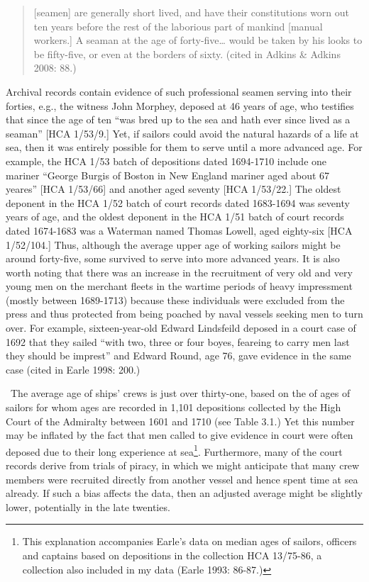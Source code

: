 \begin{quotation}
[seamen] are generally short lived, and have their constitutions worn out ten years before the rest of the laborious part of mankind [manual workers.] A seaman at the age of forty-five… would be taken by his looks to be fifty-five, or even at the borders of sixty. (cited in Adkins \& Adkins 2008: 88.) 

\end{quotation}
\begin{styleStandard}
Archival records contain evidence of such professional seamen serving into their forties, e.g., the witness John Morphey, deposed at 46 years of age, who testifies that since the age of ten “was bred up to the sea and hath ever since lived as a seaman” [HCA 1/53/9.] Yet, if sailors could avoid the natural hazards of a life at sea, then it was entirely possible for them to serve until a more advanced age. For example, the HCA 1/53 batch of depositions dated 1694-1710 include one mariner “George Burgis of Boston in New England mariner aged about 67 yeares” [HCA 1/53/66] and another aged seventy [HCA 1/53/22.] The oldest deponent in the HCA 1/52 batch of court records dated 1683-1694 was seventy years of age, and the oldest deponent in the HCA 1/51 batch of court records dated 1674-1683 was a Waterman named Thomas Lowell, aged eighty-six [HCA 1/52/104.] Thus, although the average upper age of working sailors might be around forty-five, some survived to serve into more advanced years. It is also worth noting that there was an increase in the recruitment of very old and very young men on the merchant fleets in the wartime periods of heavy impressment (mostly between 1689-1713) because these individuals were excluded from the press and thus protected from being poached by naval vessels seeking men to turn over. For example, sixteen-year-old Edward Lindsfeild deposed in a court case of 1692 that they sailed “with two, three or four boyes, feareing to carry men last they should be imprest” and Edward Round, age 76, gave evidence in the same case (cited in Earle 1998: 200.) 
\end{styleStandard}


\begin{styleStandard}
\ The average age of ships’ crews is just over thirty-one, based on the of ages of sailors for whom ages are recorded in 1,101 depositions collected by the High Court of the Admiralty between 1601 and 1710 (see Table 3.1.) Yet this number may be inflated by the fact that men called to give evidence in court were often deposed due to their long experience at sea\footnote{ This explanation accompanies Earle’s data on median ages of sailors, officers and captains based on depositions in the collection HCA 13/75-86, a collection also included in my data (Earle 1993: 86-87.)}. Furthermore, many of the court records derive from trials of piracy, in which we might anticipate that many crew members were recruited directly from another vessel and hence spent time at sea already. If such a bias affects the data, then an adjusted average might be slightly lower, potentially in the late twenties.
\end{styleStandard}


